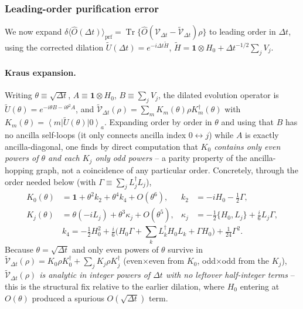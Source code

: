 \documentclass[11pt]{article}
\newcommand{\calV}{\mathcal{V}}
\newcommand{\Dt}{\Delta t}
\newcommand{\Ht}{\tilde{H}}
\renewcommand{\ket}[1]{\left| #1 \right\rangle}
\renewcommand{\bra}[1]{\left\langle #1 \right|}
\DeclareMathOperator{\Tr}{Tr}
\begin{document}
\subsubsection{Leading-order purification error}
\label{sec:prf_leading}

We now expand $\delta\langle\hat{O}(\Dt)\rangle_{\text{prf}}=\Tr\{\hat{O}\left(\calV_{\Dt}-\tilde{\calV}_{\Dt}\right)\rho\}$ to leading order in $\Dt$, using the corrected dilation $\tilde{U}(\Dt)=e^{-i\Dt\Ht}$, $\Ht=\mathbf{1}\otimes H_0+\Dt^{-1/2}\sum_jV_j$.

\paragraph{Kraus expansion.} Writing $\theta\equiv\sqrt{\Dt}$, $A\equiv\mathbf{1}\otimes H_0$, $B\equiv\sum_jV_j$, the dilated evolution operator is $\tilde{U}(\theta)=e^{-i\theta B-i\theta^2A}$, and $\tilde{\calV}_{\Dt}(\rho)=\sum_mK_m(\theta)\rho K_m^\dagger(\theta)$ with $K_m(\theta)=\bra{m}\tilde{U}(\theta)\ket{0}_a$. Expanding order by order in $\theta$ and using that $B$ has no ancilla self-loops (it only connects ancilla index $0\leftrightarrow j$) while $A$ is exactly ancilla-diagonal, one finds by direct computation that \emph{$K_0$ contains only even powers of $\theta$ and each $K_j$ only odd powers} -- a parity property of the ancilla-hopping graph, not a coincidence of any particular order. Concretely, through the order needed below (with $\Gamma\equiv\sum_jL_j^\dagger L_j$),
\begin{align}
    K_0(\theta) &= \mathbf{1}+\theta^2k_2+\theta^4k_4+O(\theta^6), & k_2&=-iH_0-\tfrac12\Gamma,\\
    K_j(\theta) &= \theta(-iL_j)+\theta^3\kappa_j+O(\theta^5), & \kappa_j&=-\tfrac12\{H_0,L_j\}+\tfrac i6L_j\Gamma,
\end{align}
\begin{equation}
    k_4 = -\tfrac12H_0^2+\tfrac i6\Big(H_0\Gamma+\textstyle\sum_kL_k^\dagger H_0L_k+\Gamma H_0\Big)+\tfrac1{24}\Gamma^2.
\end{equation}
Because $\theta=\sqrt{\Dt}$ and only even powers of $\theta$ survive in $\tilde{\calV}_{\Dt}(\rho)=K_0\rho K_0^\dagger+\sum_jK_j\rho K_j^\dagger$ (even$\times$even from $K_0$, odd$\times$odd from the $K_j$), \emph{$\tilde{\calV}_{\Dt}(\rho)$ is analytic in integer powers of $\Dt$ with no leftover half-integer terms} -- this is the structural fix relative to the earlier dilation, where $H_0$ entering at $O(\theta)$ produced a spurious $O(\sqrt{\Dt})$ term.
\end{document}
